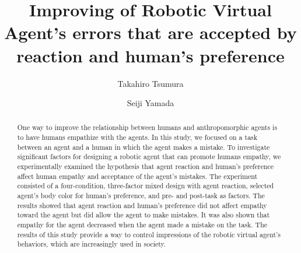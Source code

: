 \documentclass[runningheads]{llncs}
\begin{document}
%
\title{Improving of Robotic Virtual Agent's errors that are accepted by reaction and human's preference}
%
%
\author{Takahiro Tsumura \and
Seiji Yamada}
%
%
%
\maketitle              %
%
\begin{abstract}
One way to improve the relationship between humans and anthropomorphic agents is to have humans empathize with the agents. 
In this study, we focused on a task between an agent and a human in which the agent makes a mistake.
To investigate significant factors for designing a robotic agent that can promote humans empathy, we experimentally examined the hypothesis that agent reaction and human’s preference affect human empathy and acceptance of the agent's mistakes. 
The experiment consisted of a four-condition, three-factor mixed design with agent reaction, selected agent's body color for human's preference, and pre- and post-task as factors. 
The results showed that agent reaction and human’s preference did not affect empathy toward the agent but did allow the agent to make mistakes. 
It was also shown that empathy for the agent decreased when the agent made a mistake on the task. 
The results of this study provide a way to control impressions of the robotic virtual agent's behaviors, which are increasingly used in society.

\end{abstract}
%
%
%
\end{document}
